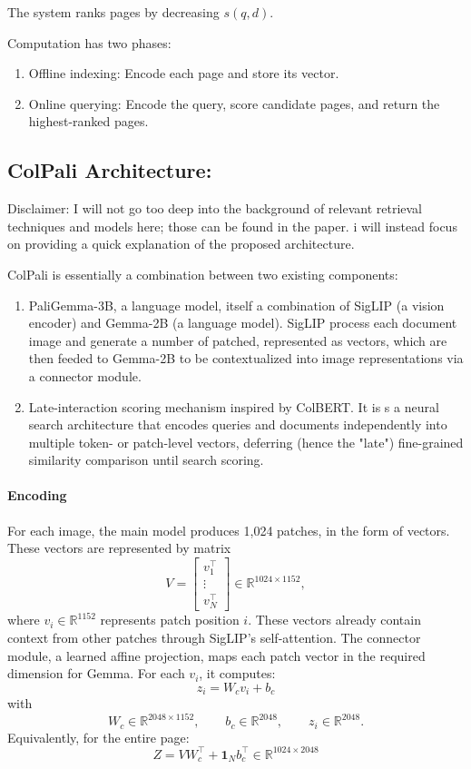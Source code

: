 \documentclass[11pt,a4paper]{article}
\begin{document}
The system ranks pages by decreasing \(s(q,d)\).

Computation has two phases:
\begin{enumerate}
    \item Offline indexing: Encode each page and store its vector.
    \item Online querying: 	Encode the query, score candidate pages, and return the highest-ranked pages.
\end{enumerate}

\subsection{ColPali Architecture:}
Disclaimer: I will not go too deep into the background of relevant retrieval techniques and models here; those can be found in the paper. i will instead focus on providing a quick explanation of the proposed architecture.

ColPali is essentially a combination between two existing components:
\begin{enumerate}
    \item PaliGemma-3B, a language model, itself a combination of SigLIP (a vision encoder) and Gemma-2B (a language model). SigLIP process each document image and generate a number of patched, represented as vectors, which are then feeded to Gemma-2B to be contextualized into image representations via a connector module.
    \item Late-interaction scoring mechanism inspired by ColBERT. It is s a neural search architecture that encodes queries and documents independently into multiple token- or patch-level vectors, deferring (hence the "late") fine-grained similarity comparison until search scoring.  
\end{enumerate}

\paragraph{Encoding} For each image, the main model produces 1,024 patches, in the form of vectors. These vectors are represented by matrix
\[
V=
\begin{bmatrix}
v_1^\top\\
\vdots\\
v_N^\top
\end{bmatrix}
\in\mathbb{R}^{1024\times1152},
\]
where \(v_i\in\mathbb{R}^{1152}\) represents patch position \(i\). These vectors already contain context from other patches through SigLIP’s self-attention. The connector module, a learned affine projection, maps each patch vector in the required dimension for Gemma. For each $v_i$, it computes:
\[
\boxed{z_i=W_cv_i+b_c}
\]
with
\[
W_c\in\mathbb{R}^{2048\times1152},
\qquad
b_c\in\mathbb{R}^{2048},
\qquad
z_i\in\mathbb{R}^{2048}.
\]
Equivalently, for the entire page:
\[
\boxed{
Z=VW_c^\top+\mathbf{1}_N b_c^\top
\in\mathbb{R}^{1024\times2048}
}
\]
\end{document}

